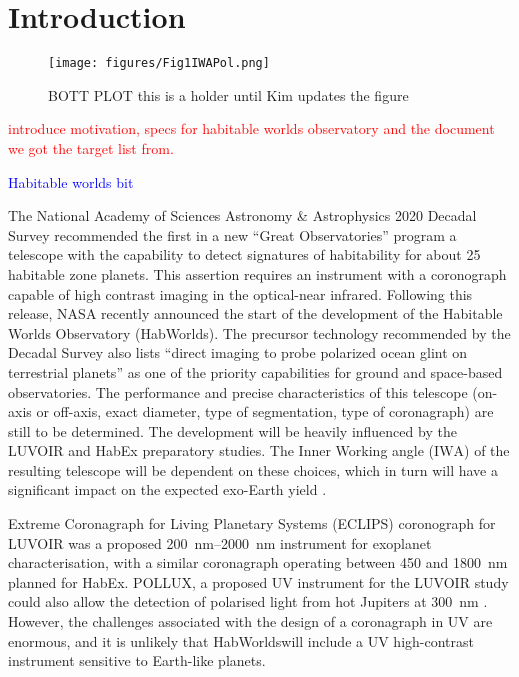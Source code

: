 \documentclass[
    usenatbib,
]{mnras}
\newcommand{\IWA}{\ensuremath{\mathrm{IWA}}}
\newcommand{\hwo}{HabWorlds}
\begin{document}
\section{Introduction}
\label{sec:intro}

\begin{figure*}%
   \centering
   \texttt{[image: figures/Fig1IWAPol.png]}
   \caption{BOTT PLOT this is a holder until Kim updates the figure}
    \label{fig:bottplot}
\end{figure*}

\textcolor{red}{introduce motivation, specs for habitable worlds observatory and the document we got the target list from.}

\textcolor{blue}{Habitable worlds bit}

The National Academy of Sciences Astronomy \& Astrophysics 2020 Decadal Survey \citep{decadal} recommended the first in a new \enquote{Great Observatories} program a telescope with the capability to detect signatures of habitability for about 25 habitable zone planets.
%
This assertion requires an instrument with a coronograph capable of high contrast imaging in the optical-near infrared.
%
Following this release, NASA recently announced the start of the development of the Habitable Worlds Observatory (\hwo).
%
The precursor technology recommended by the Decadal Survey also lists ``direct imaging to probe polarized ocean glint on terrestrial planets'' as one of the priority capabilities \citep[Box E.1 in][]{decadal} for ground and space-based observatories.
%
The performance and precise characteristics of this telescope (on-axis or off-axis, exact diameter, type of segmentation, type of coronagraph) are still to be determined.
%
The development will be heavily influenced by the LUVOIR \citep{LUVOIR2019} and HabEx \citep{HabEx_2020} preparatory studies.
%
The Inner Working angle (\IWA) of the resulting telescope will be dependent on these choices, which in turn will have a significant impact on the expected exo-Earth yield \citep{Stark2019_exoplanetyield}.

Extreme Coronagraph for Living Planetary Systems (ECLIPS) coronograph for LUVOIR was a proposed \SIrange{200}{2000}{\nano\meter} instrument for exoplanet characterisation, with a similar coronagraph operating between \num{450} and \SI{1800}{\nano\meter} planned for HabEx.
%
POLLUX, a proposed UV instrument for the LUVOIR study could also allow the detection of polarised light from hot Jupiters at \SI{300}{\nano\meter} \citep{Bouret2018_pollux}.
%
However, the challenges associated with the design of a coronagraph in UV are enormous, and it is unlikely that \hwo will include a UV high-contrast instrument sensitive to Earth-like planets.
\end{document}
